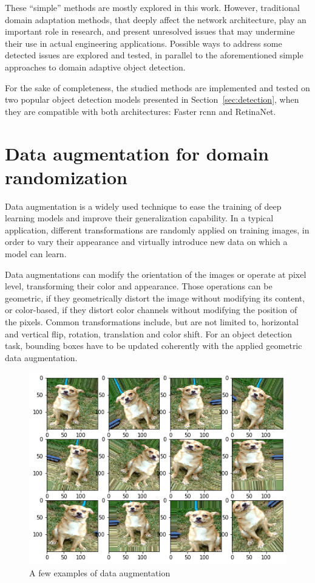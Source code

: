 \documentclass[%
    corpo=12pt,
    twoside,
    stile=classica,   
    tipotesi=magistrale,
    evenboxes,
    english,
	numerazioneromana,
]{toptesi}
\newcommand{\quotes}[1]{``#1''}
\begin{document}
\bigskip
These \quotes{simple} methods are mostly explored in this work. However, traditional domain adaptation methods, that deeply affect the network architecture, play an important role in research, and present unresolved issues that may undermine their use in actual engineering applications. Possible ways to address some detected issues are explored and tested, in parallel to the aforementioned simple approaches to domain adaptive object detection.

\bigskip
For the sake of completeness, the studied methods are implemented and tested on two popular object detection models presented in Section~\ref{sec:detection}, when they are compatible with both architectures: Faster \gls{rcnn} and RetinaNet.

\section{Data augmentation for domain randomization}\label{sec:dataaug}
Data augmentation is a widely used technique to ease the training of deep learning models and improve their generalization capability. In a typical application, different transformations are randomly applied on training images, in order to vary their appearance and virtually introduce new data on which a model can learn.

Data augmentations can modify the orientation of the images or operate at pixel level, transforming their color and appearance. Those operations can be geometric, if they geometrically distort the image without modifying its content, or color-based, if they distort color channels without modifying the position of the pixels. Common transformations include, but are not limited to, horizontal and vertical flip, rotation, translation and color shift. For an object detection task, bounding boxes have to be updated coherently with the applied geometric data augmentation.

\begin{figure}[ht!]
	\centering
	\includegraphics[width=0.8\linewidth]{imgs/augmentation.png}
	\caption{A few examples of data augmentation}
	\label{fig:augmentation}
\end{figure}
\end{document}
